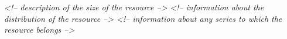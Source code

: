 \begin{shaded}
\hspace*{1em}\mbox{}\newline 
\hspace*{1em}\mbox{}\newline 
\textit{<!-- description of the size of the resource -->}\mbox{}\newline 
\hspace*{1em}\mbox{}\newline 
\hspace*{1em}\mbox{}\newline 
\hspace*{1em}\hspace*{1em}\mbox{}\newline 
\textit{<!-- information about the distribution\newline
				   of the resource -->}\mbox{}\newline 
\hspace*{1em}\hspace*{1em}\mbox{}\newline 
\hspace*{1em}\mbox{}\newline 
\hspace*{1em}\mbox{}\newline 
\hspace*{1em}\hspace*{1em}\mbox{}\newline 
\textit{<!-- information about any series to which\newline
			      the resource belongs  -->}\mbox{}\newline 
\hspace*{1em}\hspace*{1em}\mbox{}\newline 
\hspace*{1em}\mbox{}\newline 

\end{shaded}
